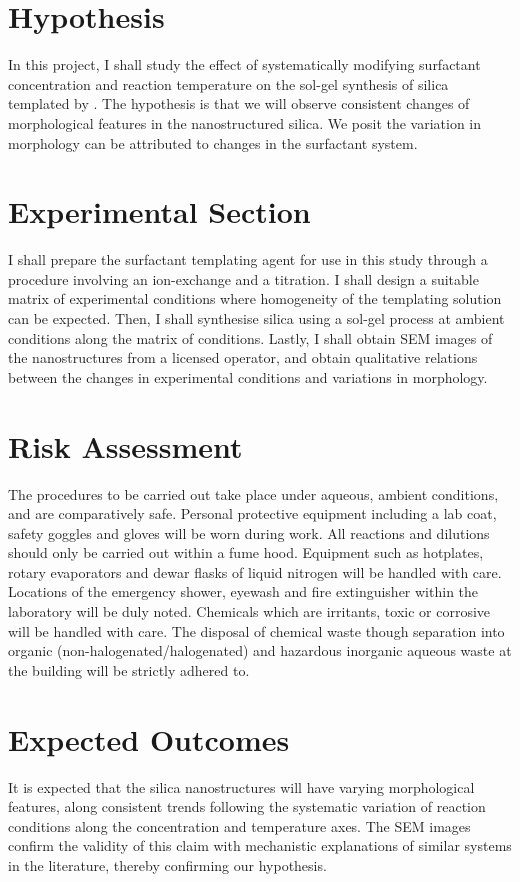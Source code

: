 \documentclass[a4paper,12pt]{article}
\begin{document}
	\section*{Hypothesis}
	In this project, I shall study the effect of systematically modifying surfactant concentration and reaction temperature on the sol-gel synthesis of silica templated by . The hypothesis is that we will observe consistent changes of morphological features in the nanostructured silica. We posit the variation in morphology can be attributed to changes in the surfactant system.
	
	\section*{Experimental Section}
	I shall prepare the surfactant templating agent for use in this study through a procedure involving an ion-exchange and a titration. I shall design a suitable matrix of experimental conditions where homogeneity of the templating solution can be expected. Then, I shall synthesise silica using a sol-gel process at ambient conditions along the matrix of conditions. Lastly, I shall obtain SEM images of the nanostructures from a licensed operator, and obtain qualitative relations between the changes in experimental conditions and variations in morphology.
	
	\section*{Risk Assessment}
	The procedures to be carried out take place under aqueous, ambient conditions, and are comparatively safe. Personal protective equipment including a lab coat, safety goggles and gloves will be worn during work. All reactions and dilutions should only be carried out within a fume hood. Equipment such as hotplates, rotary evaporators and dewar flasks of liquid nitrogen will be handled with care. Locations of the emergency shower, eyewash and fire extinguisher within the laboratory will be duly noted.
	\bigbreak
Chemicals which are irritants, toxic or corrosive will be handled with care. The disposal of chemical waste though separation into organic (non-halogenated/halogenated) and hazardous inorganic aqueous waste at the building will be strictly adhered to.
	
	\section*{Expected Outcomes}
	It is expected that the silica nanostructures will have varying morphological features, along consistent trends following the systematic variation of reaction conditions along the concentration and temperature axes. The SEM images confirm the validity of this claim with mechanistic explanations of similar systems in the literature, thereby confirming our hypothesis.
	
\end{document}
